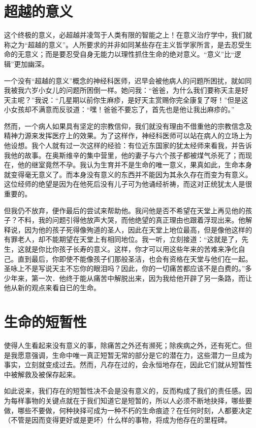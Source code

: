 \documentclass[11pt,oneside]{book}
\begin{document}
\begin{common-format}
\section{超越的意义}
这个终极的意义，必超越并凌驾于人类有限的智能之上！在意义治疗学中，我们就称之为“超越的意义”。人所要求的并非如同某些存在主义哲学家所言，是去忍受生命的无意义；而是要忍受自身无能力以理性抓住生命的绝对意义。“意义”比“逻辑”更加幽深。

一个没有“超越的意义”概念的神经科医师，迟早会被他病人的问题所困扰，就如同我被我六岁小女儿的问题所困倒一样。她问我：“爸爸，为什么我们要称天主是好天主呢？”我说：“几星期以前你生麻疹，是好天主赏赐你完全康复了呀！”但是这小女孩却不满意而反驳道：“嘿！爸爸不要忘了，首先也是他让我出麻疹的。”

然而，一个病人如果具有坚定的宗教信仰，我们就没有理由不借重他的宗教信念及精神力源来发挥医疗上的效果。为了这样作，神经科医师可以站在病人的立场上为他设想。我个人就有过一次这样的经验：有位近东国家的犹太经师来看我，并告诉我他的故事。在奥斯维辛的集中营里，他的妻子与六个孩子都被煤气杀死了；而现在，他的继室竟然不孕。我认为生育并不是生命的唯一意义，果真如此，生命本身就变得毫无意义了。而本身没有意义的东西并不能因为其永久存在而变为有意义。这位经师的绝望是因为在他死后没有儿子可为他诵经祈祷，而这对正统犹太人是很重要的。

但我仍不放弃，便作最后的尝试来帮助他。我问他是否不希望在天堂上再见他的孩子？不料，我的问题引得他放声大哭，而他绝望的真正理由也跟着浮现出来。他解释说，因为他的孩子死得像殉道的圣人，因此在天堂上地位最高，但是像他这样的有罪老人，却不能期望在天堂上有相同地位。我一听，立刻接道：“这就是了，先生，这就是你比你孩子长寿的意义。这样，你才可以用这些年来的苦难来净化自己。直到最后，你即使不能像孩子们那般圣洁，也会有资格在天堂与他们在一起。圣咏上不是写说天主不忘你的眼泪吗？因此，你的一切痛苦都应该不是白费的。”多少年来，第一次．他终于能从痛苦中解脱出来，因为我给他开辟了另一条路，而让他从新的观点来看自已的生命。


\section{生命的短暂性}
使得人生看起来没有意义的事，除痛苦之外还有濒死；除疾病之外，还有死亡。但是我愿意强调，生命中唯一真正短暂无常的部分是它的潜在力，这些潜力一旦成为事实，立刻就变成过去。然而，凡存在过的，会永恒地存在，因此它们就从短暂性中被解救及被保存起来。

如此说来，我们存在的短暂性决不会是没有意义的，反而构成了我们的责任感。因为每样事物的关键点就在于我们知道它是短暂的，所以人必须不断地抉择，哪些要做，哪些不要做，何种抉择可成为一种不朽的生命痕迹？在任何时刻，人都要决定（不管是因而变得更好或是更坏）什么样的事物，将成为他存在的里程碑。


\end{common-format}
\end{document}
